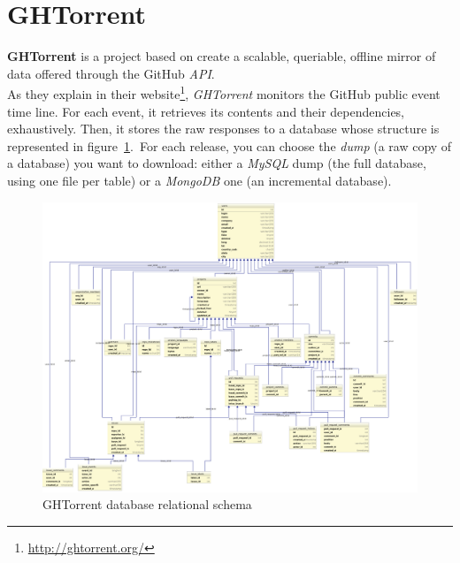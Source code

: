 \documentclass[a4paper, 12pt]{book}
\begin{document}
\section{GHTorrent}
\label{sec:ghtorrent}
\textbf{GHTorrent} is a project based on create a scalable, queriable, offline mirror of data offered through the GitHub \textit{API}.\\
As they explain in their website\footnote{\url{http://ghtorrent.org/}}, \emph{GHTorrent} monitors the GitHub public event time line.
For each event, it retrieves its contents and their dependencies, exhaustively. Then, it stores the raw responses to a database whose
structure is represented in figure~\ref{fig:ghtorrent-schema}.\
For each release, you can choose the \textit{dump} (a raw copy of a database) you want to download: either a \emph{MySQL} dump
(the full database, using one file per table) or a \emph{MongoDB} one (an incremental database).
\begin{figure}
  \centering
  \includegraphics[width=16cm, keepaspectratio]{img/ghtorrent-schema}
  \caption{GHTorrent database relational schema}
  \label{fig:ghtorrent-schema}
\end{figure}
\end{document}
